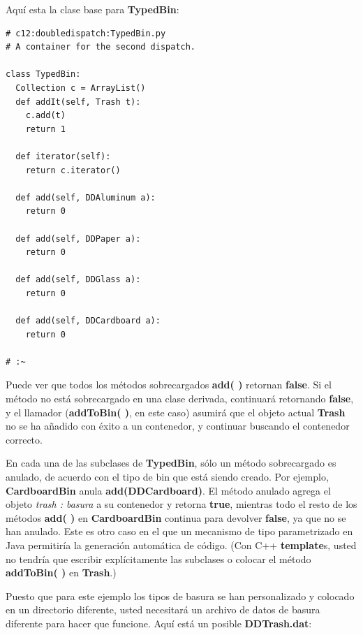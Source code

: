 \documentclass{article}
\begin{document}
Aquí esta la clase base para \textbf{TypedBin}:         \newline

\begin{lstlisting} 
# c12:doubledispatch:TypedBin.py 
# A container for the second dispatch. 

class TypedBin: 
  Collection c = ArrayList() 
  def addIt(self, Trash t): 
    c.add(t) 
    return 1 
    
  def iterator(self): 
    return c.iterator() 
    
  def add(self, DDAluminum a): 
    return 0 
    
  def add(self, DDPaper a): 
    return 0 
    
  def add(self, DDGlass a): 
    return 0 
    
  def add(self, DDCardboard a): 
    return 0 
    
# :~ 
\end{lstlisting}

Puede ver que todos los métodos sobrecargados \textbf{add( )} retornan  \textbf{false}. Si el método no está sobrecargado en una clase derivada, continuará retornando \textbf{false},  y el llamador (\textbf{addToBin( )}, en este caso)  asumirá que el objeto actual \textbf{Trash} no se ha añadido con éxito a un contenedor, y continuar buscando el contenedor correcto.         \newline

En cada una de las subclases de \textbf{TypedBin}, sólo un método sobrecargado es anulado, de acuerdo con el tipo de bin que está siendo creado. Por ejemplo, \textbf{CardboardBin} anula \textbf{add(DDCardboard)}. El método anulado agrega el objeto\textit{ trash : basura} a su contenedor y retorna \textbf{true}, mientras todo el resto de los métodos \textbf{add( )} en \textbf{CardboardBin} continua para devolver \textbf{false}, ya que no se han anulado. Este es otro caso en el que un mecanismo de tipo parametrizado en Java permitiría la generación automática de código. (Con C++ \textbf{template}s, usted no tendría que escribir explícitamente las subclases o colocar el método \textbf{addToBin( )} en \textbf{Trash}.)      \newline

Puesto que para este ejemplo los tipos de basura se han personalizado y colocado en un directorio diferente, usted necesitará un archivo de datos de basura diferente para hacer que funcione. Aquí está un posible \textbf{DDTrash.dat}:      \newline
\end{document}

